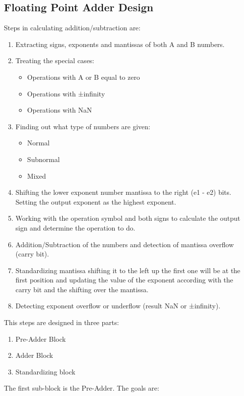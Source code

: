 \documentclass{scrreprt}
\begin{document}
\subsection*{Floating Point Adder Design}
Steps in calculating addition/subtraction are: 
\begin{enumerate}
    \item Extracting signs, exponents and mantissas of both A and B numbers.
    \item Treating the special cases:
      \begin{itemize}
          \item Operations with A or B equal to zero 
          \item Operations with ±infinity
          \item Operations with NaN 
      \end{itemize}  
    \item Finding out what type of numbers are given:
        \begin{itemize}
              \item Normal
              \item Subnormal
              \item Mixed 
          \end{itemize} 
    \item  Shifting the lower exponent number mantissa to the right (e1 - e2) bits. Setting the output exponent as the highest exponent.   \item  Working with the operation symbol and both signs to calculate the output sign and determine the operation to do.
    \item Addition/Subtraction of the numbers and detection of mantissa overflow (carry bit).
    \item Standardizing mantissa shifting it to the left up the first one will be at the first position and updating the value of the exponent according with the carry bit and the shifting over the mantissa. 
    \item Detecting exponent overflow or underflow (result NaN or ±infinity).
\end{enumerate}
This steps are designed in three parts:
\begin{enumerate}
    \item Pre-Adder Block
    \item Adder Block
    \item Standardizing block 
\end{enumerate}
The first sub-block is the Pre-Adder. The goals are:
\end{document}
